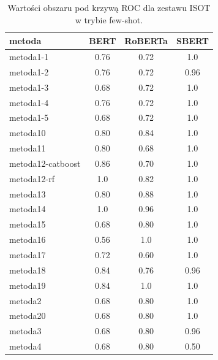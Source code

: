 \begin{table}[H]
	\centering
	\caption{Wartości obszaru pod krzywą ROC dla zestawu ISOT w trybie few-shot.}
	\label{tab:roc_auc_fes_shot_isot}
	\small
	\begin{tabular}{lccc}
		\toprule
		\textbf{metoda}   & \textbf{BERT} & \textbf{RoBERTa} & \textbf{SBERT} \\
		\midrule
		metoda1-1         & 0.76          & 0.72             & 1.0            \\
		metoda1-2         & 0.76          & 0.72             & 0.96           \\
		metoda1-3         & 0.68          & 0.72             & 1.0            \\
		metoda1-4         & 0.76          & 0.72             & 1.0            \\
		metoda1-5         & 0.68          & 0.72             & 1.0            \\
		metoda10          & 0.80          & 0.84             & 1.0            \\
		metoda11          & 0.80          & 0.68             & 1.0            \\
		metoda12-catboost & 0.86          & 0.70             & 1.0            \\
		metoda12-rf       & 1.0           & 0.82             & 1.0            \\
		metoda13          & 0.80          & 0.88             & 1.0            \\
		metoda14          & 1.0           & 0.96             & 1.0            \\
		metoda15          & 0.68          & 0.80             & 1.0            \\
		metoda16          & 0.56          & 1.0              & 1.0            \\
		metoda17          & 0.72          & 0.60             & 1.0            \\
		metoda18          & 0.84          & 0.76             & 0.96           \\
		metoda19          & 0.84          & 1.0              & 1.0            \\
		metoda2           & 0.68          & 0.80             & 1.0            \\
		metoda20          & 0.68          & 0.80             & 1.0            \\
		metoda3           & 0.68          & 0.80             & 0.96           \\
		metoda4           & 0.68          & 0.80             & 0.50           \\

\end{tabular}
\end{table}
